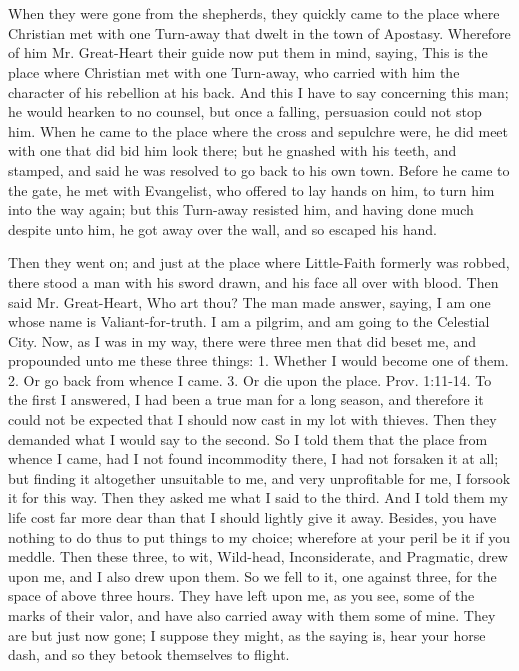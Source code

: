 \chapter[THE EIGHTH STAGE]{}

When they were gone from the shepherds, they quickly came to the place where Christian met with one Turn-away that dwelt in the town of Apostasy. Wherefore of him Mr. Great-Heart their guide now put them in mind, saying, This is the place where Christian met with one Turn-away, who carried with him the character of his rebellion at his back. And this I have to say concerning this man; he would hearken to no counsel, but once a falling, persuasion could not stop him. When he came to the place where the cross and sepulchre were, he did meet with one that did bid him look there; but he gnashed with his teeth, and stamped, and said he was resolved to go back to his own town. Before he came to the gate, he met with Evangelist, who offered to lay hands on him, to turn him into the way again; but this Turn-away resisted him, and having done much despite unto him, he got away over the wall, and so escaped his hand.

Then they went on; and just at the place where Little-Faith formerly was robbed, there stood a man with his sword drawn, and his face all over with blood. Then said Mr. Great-Heart, Who art thou? The man made answer, saying, I am one whose name is Valiant-for-truth. I am a pilgrim, and am going to the Celestial City. Now, as I was in my way, there were three men that did beset me, and propounded unto me these three things: 1. Whether I would become one of them. 2. Or go back from whence I came. 3. Or die upon the place. Prov. 1:11-14. To the first I answered, I had been a true man for a long season, and therefore it could not be expected that I should now cast in my lot with thieves. Then they demanded what I would say to the second. So I told them that the place from whence I came, had I not found incommodity there, I had not forsaken it at all; but finding it altogether unsuitable to me, and very unprofitable for me, I forsook it for this way. Then they asked me what I said to the third. And I told them my life cost far more dear than that I should lightly give it away. Besides, you have nothing to do thus to put things to my choice; wherefore at your peril be it if you meddle. Then these three, to wit, Wild-head, Inconsiderate, and Pragmatic, drew upon me, and I also drew upon them. So we fell to it, one against three, for the space of above three hours. They have left upon me, as you see, some of the marks of their valor, and have also carried away with them some of mine. They are but just now gone; I suppose they might, as the saying is, hear your horse dash, and so they betook themselves to flight.

